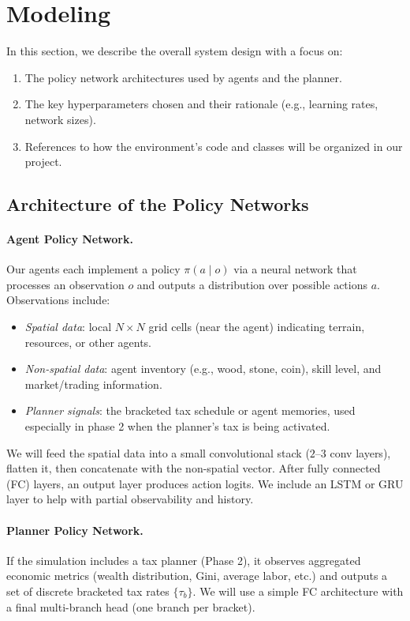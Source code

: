 \section{Modeling}
\label{sec:modeling}

In this section, we describe the overall system design with a focus on:
\begin{enumerate}
    \item The policy network architectures used by agents and the planner.
    \item The key hyperparameters chosen and their rationale (e.g., learning rates, network sizes).
    \item References to how the environment’s code and classes will be organized in our project.
\end{enumerate}

\subsection{Architecture of the Policy Networks}

\paragraph{Agent Policy Network.}
Our agents each implement a policy \(\pi(a \mid o)\) via a neural network that processes an observation \(o\) and outputs a distribution over possible actions \(a\). Observations include:
\begin{itemize}
    \item \emph{Spatial data}: local $N\times N$ grid cells (near the agent) indicating terrain, resources, or other agents.
    \item \emph{Non-spatial data}: agent inventory (e.g., wood, stone, coin), skill level, and market/trading information.
    \item \emph{Planner signals}: the bracketed tax schedule or agent memories, used especially in phase 2 when the planner's tax is being activated.
\end{itemize}
We will feed the spatial data into a small convolutional stack (\(2\)–\(3\) conv layers), flatten it, then concatenate with the non-spatial vector. After fully connected (FC) layers, an output layer produces action logits. We include an LSTM or GRU layer to help with partial observability and history.

\paragraph{Planner Policy Network.}
If the simulation includes a tax planner (Phase 2), it observes aggregated economic metrics (wealth distribution, Gini, average labor, etc.) and outputs a set of discrete bracketed tax rates \(\{\tau_b\}\). We will use a simple FC architecture with a final multi-branch head (one branch per bracket). 

